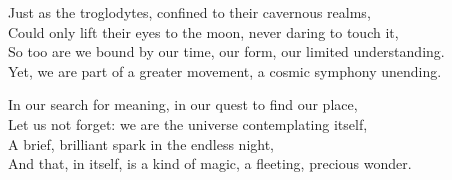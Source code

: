 \documentclass[10pt,letterpaper]{article}
\begin{document}
\begin{center}
\bigskip

Just as the troglodytes, confined to their cavernous realms,\\
Could only lift their eyes to the moon, never daring to touch it,\\
So too are we bound by our time, our form, our limited understanding.\\
Yet, we are part of a greater movement, a cosmic symphony unending.\\

\bigskip

In our search for meaning, in our quest to find our place,\\
Let us not forget: we are the universe contemplating itself,\\
A brief, brilliant spark in the endless night,\\
And that, in itself, is a kind of magic, a fleeting, precious wonder.
\end{center}
\end{document}
